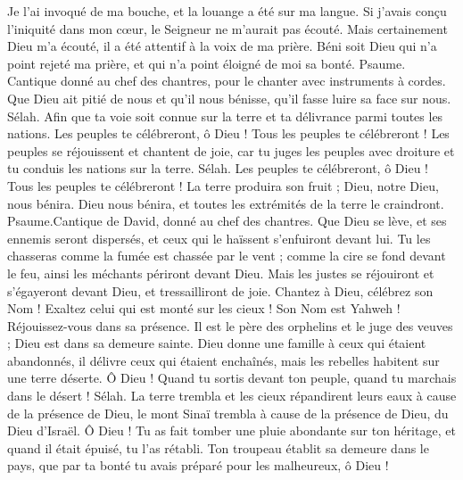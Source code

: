 \begin{multicols}{2}
Je l'ai invoqué de ma bouche, et la louange a été sur ma langue.
Si j'avais conçu l'iniquité dans mon cœur, le Seigneur ne m'aurait pas écouté.
Mais certainement Dieu m'a écouté, il a été attentif à la voix de ma prière.
Béni soit Dieu qui n'a point rejeté ma prière, et qui n'a point éloigné de moi sa bonté.
\VerseOne{}Psaume. Cantique donné au chef des chantres, pour le chanter avec instruments à cordes.
Que Dieu ait pitié de nous et qu'il nous bénisse, qu'il fasse luire sa face sur nous. Sélah.
Afin que ta voie soit connue sur la terre et ta délivrance parmi toutes les nations.
Les peuples te célébreront, ô Dieu ! Tous les peuples te célébreront !
Les peuples se réjouissent et chantent de joie, car tu juges les peuples avec droiture et tu conduis les nations sur la terre. Sélah.
Les peuples te célébreront, ô Dieu ! Tous les peuples te célébreront !
La terre produira son fruit ; Dieu, notre Dieu, nous bénira.
Dieu nous bénira, et toutes les extrémités de la terre le craindront.
\VerseOne{}Psaume.Cantique de David, donné au chef des chantres.
Que Dieu se lève, et ses ennemis seront dispersés, et ceux qui le haïssent s'enfuiront devant lui.
Tu les chasseras comme la fumée est chassée par le vent ; comme la cire se fond devant le feu, ainsi les méchants périront devant Dieu.
Mais les justes se réjouiront et s'égayeront devant Dieu, et tressailliront de joie.
Chantez à Dieu, célébrez son Nom ! Exaltez celui qui est monté sur les cieux ! Son Nom est Yahweh ! Réjouissez-vous dans sa présence.
Il est le père des orphelins et le juge des veuves ; Dieu est dans sa demeure sainte.
Dieu donne une famille à ceux qui étaient abandonnés, il délivre ceux qui étaient enchaînés, mais les rebelles habitent sur une terre déserte.
Ô Dieu ! Quand tu sortis devant ton peuple, quand tu marchais dans le désert ! Sélah.
La terre trembla et les cieux répandirent leurs eaux à cause de la présence de Dieu, le mont Sinaï trembla à cause de la présence de Dieu, du Dieu d'Israël.
Ô Dieu ! Tu as fait tomber une pluie abondante sur ton héritage, et quand il était épuisé, tu l'as rétabli.
Ton troupeau établit sa demeure dans le pays, que par ta bonté tu avais préparé pour les malheureux, ô Dieu !

\end{multicols}
